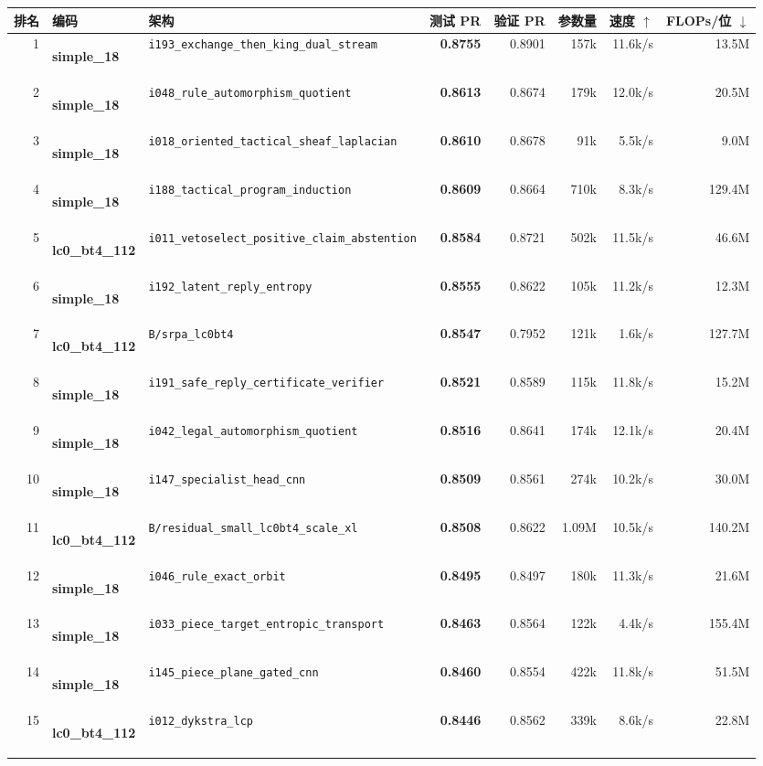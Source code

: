 \documentclass[10pt,a4paper]{article}
\newcommand{\pilllc}[0]{\colorbox{lc0bluebg}{\strut\textcolor{lc0blue}{\scriptsize\bfseries\sffamily lc0\_bt4\_112}}}
\newcommand{\pillsi}[0]{\colorbox{s18redbg}{\strut\textcolor{s18red}{\scriptsize\bfseries\sffamily simple\_18}}}
\begin{document}
\begin{small}
\begin{longtable}{@{}r l p{5.6cm} r r r r r@{}}
\toprule
\textbf{排名} & \textbf{编码} & \textbf{架构} &
\textbf{测试 PR} & \textbf{验证 PR} & \textbf{参数量} & \textbf{速度 $\uparrow$} & \textbf{FLOPs/位 $\downarrow$} \\
\midrule
\endhead
1 & \pillsi{} & \texttt{i193\_exchange\_then\_king\_dual\_stream} & \textbf{0.8755} & 0.8901 & 157k & 11.6k/s & 13.5M \\
2 & \pillsi{} & \texttt{i048\_rule\_automorphism\_quotient} & \textbf{0.8613} & 0.8674 & 179k & 12.0k/s & 20.5M \\
3 & \pillsi{} & \texttt{i018\_oriented\_tactical\_sheaf\_laplacian} & \textbf{0.8610} & 0.8678 & 91k & 5.5k/s & 9.0M \\
4 & \pillsi{} & \texttt{i188\_tactical\_program\_induction} & \textbf{0.8609} & 0.8664 & 710k & 8.3k/s & 129.4M \\
5 & \pilllc{} & \texttt{i011\_vetoselect\_positive\_claim\_abstention} & \textbf{0.8584} & 0.8721 & 502k & 11.5k/s & 46.6M \\
6 & \pillsi{} & \texttt{i192\_latent\_reply\_entropy} & \textbf{0.8555} & 0.8622 & 105k & 11.2k/s & 12.3M \\
7 & \pilllc{} & \texttt{B/srpa\_lc0bt4} & \textbf{0.8547} & 0.7952 & 121k & 1.6k/s & 127.7M \\
8 & \pillsi{} & \texttt{i191\_safe\_reply\_certificate\_verifier} & \textbf{0.8521} & 0.8589 & 115k & 11.8k/s & 15.2M \\
9 & \pillsi{} & \texttt{i042\_legal\_automorphism\_quotient} & \textbf{0.8516} & 0.8641 & 174k & 12.1k/s & 20.4M \\
10 & \pillsi{} & \texttt{i147\_specialist\_head\_cnn} & \textbf{0.8509} & 0.8561 & 274k & 10.2k/s & 30.0M \\
11 & \pilllc{} & \texttt{B/residual\_small\_lc0bt4\_scale\_xl} & \textbf{0.8508} & 0.8622 & 1.09M & 10.5k/s & 140.2M \\
12 & \pillsi{} & \texttt{i046\_rule\_exact\_orbit} & \textbf{0.8495} & 0.8497 & 180k & 11.3k/s & 21.6M \\
13 & \pillsi{} & \texttt{i033\_piece\_target\_entropic\_transport} & \textbf{0.8463} & 0.8564 & 122k & 4.4k/s & 155.4M \\
14 & \pillsi{} & \texttt{i145\_piece\_plane\_gated\_cnn} & \textbf{0.8460} & 0.8554 & 422k & 11.8k/s & 51.5M \\
15 & \pilllc{} & \texttt{i012\_dykstra\_lcp} & \textbf{0.8446} & 0.8562 & 339k & 8.6k/s & 22.8M \\
\bottomrule
\end{longtable}
\end{small}
\end{document}
